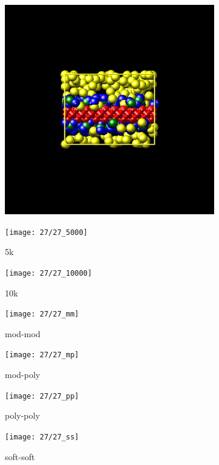 \documentclass[a4paper]{article}
\begin{document}
\begin{figure}[H]
\begin{subfigure}{0.3\textwidth}
  \centering
  \includegraphics[width=\linewidth,keepaspectratio]{start}
  \caption{}
\end{subfigure}
\begin{subfigure}{0.3\textwidth}
  \centering
  \texttt{[image: 27/27\_5000]}
  \caption{5k}
\end{subfigure}
\begin{subfigure}{0.3\textwidth}
  \centering
  \texttt{[image: 27/27\_10000]}
  \caption{10k}
\end{subfigure}
\caption{}
\label{fig_1}
\end{figure}

\begin{figure}[H]
\begin{subfigure}{0.24\textwidth}
  \centering
  \texttt{[image: 27/27\_mm]}
  \caption{mod-mod}
\end{subfigure}
\begin{subfigure}{0.24\textwidth}
  \centering
  \texttt{[image: 27/27\_mp]}
  \caption{mod-poly}
\end{subfigure}
\begin{subfigure}{0.24\textwidth}
  \centering
  \texttt{[image: 27/27\_pp]}
  \caption{poly-poly}
\end{subfigure}
\begin{subfigure}{0.24\textwidth}
  \centering
  \texttt{[image: 27/27\_ss]}
  \caption{soft-soft}
\end{subfigure}
\caption{}
\label{fig_1}
\end{figure}
\end{document}
